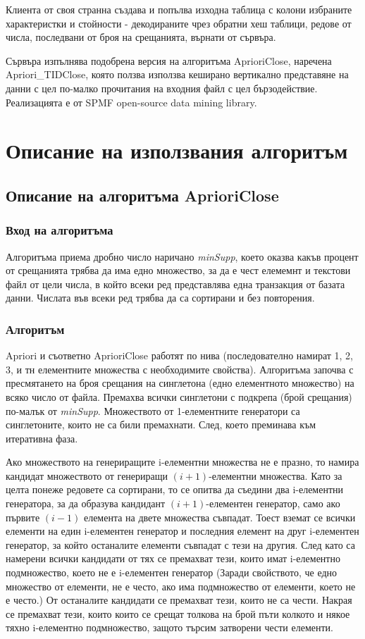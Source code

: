 \documentclass[a4paper, 12pt]{article}
\begin{document}
Клиента от своя странна създава и попълва изходна таблица с колони избраните характеристки
и стойности - декодираните чрез обратни хеш таблици, редове от числа, последвани от броя на срещанията, върнати от сървъра.

Сървъра изпълнява подобрена версия на алгоритъма AprioriClose, наречена Apriori\_TIDClose,
която ползва използва кеширано вертикално представяне на данни с цел по-малко прочитания на входния файл с цел бързодействие.
Реализацията е от SPMF open-source data mining library.

\section{Описание на използвания алгоритъм}
\subsection{Описание на алгоритъма AprioriClose}
\subsubsection{Вход на алгоритъма}
Алгоритъма приема дробно число наричано \textit{minSupp},
което оказва какъв процент от срещанията трябва да има едно множество,
за да е чест  елемемнт и текстови файл от цели числа,
в който всеки ред представлява една транзакция от базата данни.
Числата във всеки ред трябва да са сортирани и без повторения.
\subsubsection{Алгоритъм}
Apriori и съответно AprioriClose работят по нива (последователно намират 1, 2, 3, и тн елементните множества с необходимите свойства). 
Алгоритъма започва с пресмятането на броя срещания на синглетона (едно елементното множество) на всяко число от файла.
Премахва всички синглетони с подкрепа (брой срещания) по-малък от \textit{minSupp}.
Множеството от 1-елементните генератори са синглетоните, които не са били премахнати.
След, което преминава към итеративна фаза.

Ако множеството на генериращите i-елементни множества не е празно,
то намира кандидат множеството от генериращи \((i + 1)\)-елементни множества.
Като за целта понеже редовете са сортирани, то се опитва да съедини два i-елементни генератора,
за да образува кандидант \((i + 1)\)-елементен генератор, само ако първите \((i - 1)\) елемента на двете множества съвпадат.
Тоест вземат се всички елементи на един i-елементен генератор и последния елемент на друг i-елементен генератор, за който останалите елементи съвпадат с тези на другия.
След като са намерени всички кандидати от тях се премахват тези, които имат i-елементно подмножество, което не е i-елементен генератор (Заради свойството, че едно множество от елементи, не е често, ако има подмножество от елементи, което не е често.)
От останалите кандидати се премахват тези, които не са чести.
Накрая се премахват тези, които които се срещат толкова на брой пъти колкото и някое тяхно i-елементно подмножество,
защото търсим затворени чести елементи.
\end{document}

